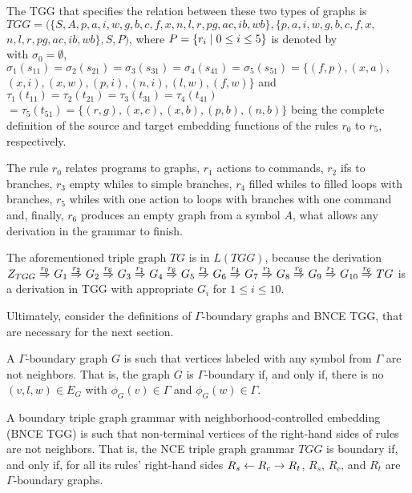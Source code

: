 \documentclass[runningheads]{llncs}
\begin{document}
\begin{example}
	
	
	The TGG that specifies the relation between these two types of graphs is $TGG = (\{S, A, p, a, i, w, g, b, c, f, x, n, l, r, pg, ac, ib, wb\}, \{p, a, i, w, g, b, c, f, x,$ $ n, l, r, pg, ac, ib, wb\}, S, P)$, where $P = \{r_i \; | \; 0 \le i \le 5\}$ is denoted by\\
	
	
	\noindent
	with $\sigma_0 = \emptyset$, $\sigma_1(s_{11}) = \sigma_2(s_{21}) = \sigma_3(s_{31}) = \sigma_4(s_{41}) =\sigma_5(s_{51}) = \{ (f,p), (x,a), $ $(x,i), (x,w), (p,i), (n,i), (l,w), (f,w) \}$ and $\tau_1(t_{11}) = \tau_2(t_{21}) = \tau_3(t_{31}) = \tau_4(t_{41}) $ $= \tau_5(t_{51}) = \{ (r,g), (x,c), (x,b), (p,b), (n,b)\}$ being the complete definition of the source and target embedding functions of the rules $r_0$ to $r_5$, respectively.
	
	The rule $r_0$ relates programs to graphs, $r_1$ actions to commands, $r_2$ ifs to branches, $r_3$ empty whiles to simple branches, $r_4$ filled whiles to filled loops with branches, $r_5$ whiles with one action to loops with branches with one command and, finally, $r_6$ produces an empty graph from a symbol $A$, what allows any derivation in the grammar to finish.
	
	The aforementioned triple graph $TG$ is in $L(TGG)$, because the derivation
	$
	\startTG{TGG} \tderiv{r_0}{}{} G_1 \tderiv{r_2}{}{} G_2 \tderiv{r_6}{}{} G_3 \tderiv{r_1}{}{} G_4 \tderiv{r_6}{}{} G_5 \tderiv{r_1}{}{} G_6 \tderiv{r_4}{}{} G_7 \tderiv{r_1}{}{} G_8 \tderiv{r_6}{}{} G_9 \tderiv{r_1}{}{} G_{10} \tderiv{r_6}{}{} TG
	$
	is a derivation in TGG with appropriate $G_i$ for $1 \le i \le 10$.
\end{example}

Ultimately, consider the definitions of $\Gamma\text{-boundary}$ graphs and BNCE TGG, that are necessary for the next section.

\begin{definition}
	A $\Gamma\text{-boundary}$ graph $G$ is such that vertices labeled with any symbol from $\Gamma$ are not neighbors. That is, the graph $G$ is $\Gamma\text{-boundary}$ if, and only if, there is no $(v,l,w) \in E_G$ with $\phi_G(v) \in \Gamma$ and $\phi_G(w) \in \Gamma$.
\end{definition}

\begin{definition}
	\label{def:bncetgg}
	A boundary triple graph grammar with neighborhood-controlled embedding (BNCE TGG) is such that non-terminal vertices of the right-hand sides of rules are not neighbors. That is, the NCE triple graph grammar $TGG$ is boundary if, and only if, for all its rules' right-hand sides $R_s \overset{}{\leftarrow} R_c \overset{}{\rightarrow} R_t$, $R_s$, $R_c$, and $R_t$ are $\Gamma\text{-boundary}$ graphs.
\end{definition}
\end{document}
